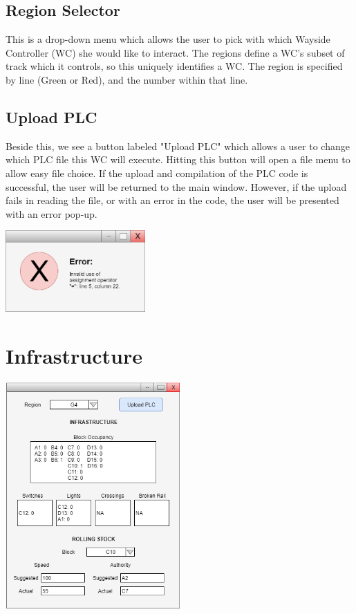 \documentclass{scrreprt}
\begin{document}
\subsection{Region Selector}
This is a drop-down menu which allows the user to pick with which Wayside Controller (WC) she would like to interact.
The regions define a WC's subset of track which it controls, so this uniquely identifies a WC.
The region is specified by line (Green or Red), and the number within that line.

\subsection{Upload PLC}
Beside this, we see a button labeled "Upload PLC" which allows a user to change which PLC file this WC will execute.
Hitting this button will open a file menu to allow easy file choice.
If the upload and compilation of the PLC code is successful, the user will be returned to the main window.
However, if the upload fails in reading the file, or with an error in the code, the user will be presented with an error pop-up.

\begin{center}
\includegraphics[width=0.4\textwidth]{wc-error}
\end{center}




\section{Infrastructure}
\begin{center}
    \includegraphics[trim = {0cm 3cm 0cm 1.3cm }, clip, width=0.5\textwidth]{wc-ui}
\end{center}
\end{document}
